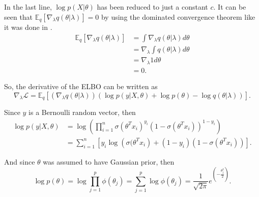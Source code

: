 In the last line, $\log p(X | \theta)$ has been reduced to just a constant $c$. It can be seen that $\mathbb{E}_q \left[ \nabla_{\lambda} q(\theta | \lambda) \right] = 0$ by using the dominated convergence theorem like it was done in \cite{ranganath2014black}.
\begin{equation}
  \begin{split}
      \mathbb{E}_q \left[ \nabla_{\lambda} q(\theta | \lambda) \right] &=
      \int \nabla_{\lambda} q(\theta | \lambda) d\theta \\
      &= \nabla_{\lambda} \int q(\theta | \lambda) d\theta \\
      &= \nabla_{\lambda} 1 d\theta \\
      &= 0.
  \end{split}
\end{equation}

So, the derivative of the ELBO can be written as
\begin{equation}
  \nabla_{\lambda} \mathcal{L} = \mathbb{E}_q \left[ \left( \nabla_{\lambda} q(\theta | \lambda) \right) \left( \log p(y | X, \theta) + \log p(\theta) - \log q(\theta | \lambda) \right) \right].
\end{equation}

Since $y$ is a Bernoulli random vector, then
\begin{equation}
  \begin{split}
      \log p(y | X, \theta) &=
      \log \left( \prod_{i = 1}^n \sigma(\theta^T x_i)^{y_i} (1 - \sigma(\theta^T x_i))^{1-y_i} \right) \\
      &= \sum_{i = 1}^n \left[ y_i \log \left( \sigma(\theta^T x_i \right) + (1 - y_i) (1 - \sigma(\theta^T x_i)) \right].
  \end{split}
\end{equation}

And since $\theta$ was assumed to have Gaussian prior, then
\begin{equation}
  \log p(\theta) = \log \prod_{j = 1}^p \phi(\theta_j) = \sum_{j = 1}^p \log \phi(\theta_j) = \frac{1}{\sqrt{2 \pi}} e^{\left( -\frac{\theta_j^2}{2} \right)}.
\end{equation}

